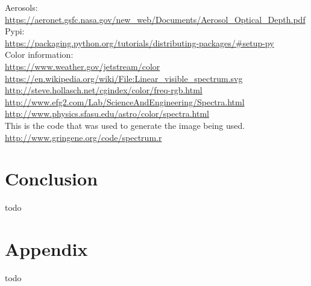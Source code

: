 \documentclass[onecolumn, draftclsnofoot,10pt, compsoc]{IEEEtran}
\begin{document}
\begin{singlespace}
		Aerosols:\\
		\url{https://aeronet.gsfc.nasa.gov/new_web/Documents/Aerosol_Optical_Depth.pdf} \\

		Pypi:\\
		\url{https://packaging.python.org/tutorials/distributing-packages/#setup-py} \\
		
		Color information: \\
		\url{https://www.weather.gov/jetstream/color} \\
		\url{https://en.wikipedia.org/wiki/File:Linear_visible_spectrum.svg} \\
		\url{http://steve.hollasch.net/cgindex/color/freq-rgb.html} \\
		\url{http://www.efg2.com/Lab/ScienceAndEngineering/Spectra.html} \\
		\url{http://www.physics.sfasu.edu/astro/color/spectra.html} \\

		This is the code that was used to generate the image being used. \\
		\url{http://www.gringene.org/code/spectrum.r} \\


	\section{Conclusion}
		todo \cite{neural}
	\section{Appendix}
		todo
\end{singlespace}
\clearpage


\end{document}
